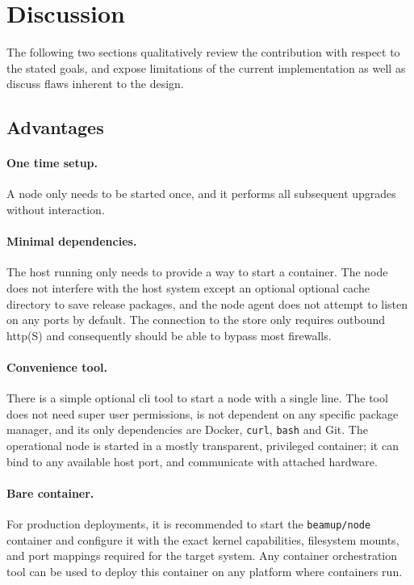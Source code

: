 \cleardoublepage
\section{Discussion}

The following two sections qualitatively review the contribution with respect to the stated goals, and expose limitations of the current implementation as well as discuss flaws inherent to the design.

\subsection{Advantages}

\paragraph{One time setup.} A node only needs to be started once, and it performs all subsequent upgrades without interaction.

\paragraph{Minimal dependencies.} The host running only needs to provide a way to start a container. The node does not interfere with the host system except an optional optional cache directory to save release packages, and the node agent does not attempt to listen on any ports by default. The connection to the store only requires outbound \acrshort{http}(S) and consequently should be able to bypass most firewalls.

\paragraph{Convenience tool.} There is a simple optional \acrshort{cli} tool to start a node with a single line. The tool does not need super user permissions, is not dependent on any specific package manager, and its only dependencies are Docker, \lstinline|curl|, \lstinline|bash| and Git. The operational node is started in a mostly transparent, privileged container; it can bind to any available host port, and communicate with attached hardware.

\paragraph{Bare container.} For production deployments, it is recommended to start the \lstinline|beamup/node| container and configure it with the exact kernel capabilities, filesystem mounts, and port mappings required for the target system. Any container orchestration tool can be used to deploy this container on any platform where containers run.

